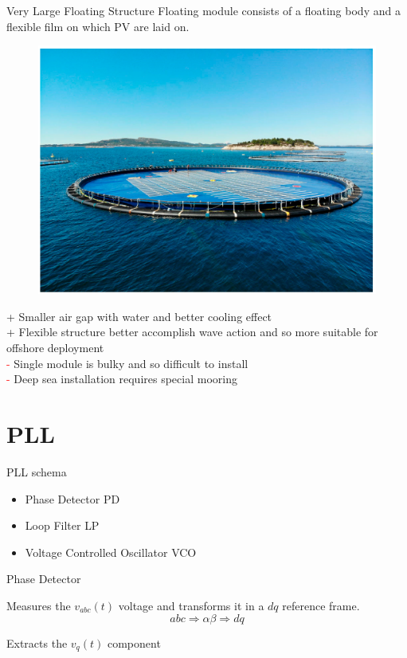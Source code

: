 \documentclass[aspectratio=169, 12pt]{beamer}
\begin{document}
\begin{frame}{Very Large Floating Structure}
  Floating module consists of a floating body and a flexible film on which PV are laid on.
  \begin{figure}
    \centering
    \includegraphics[width=0.3\columnwidth]{figure/vlfs.png}
  \end{figure}

  \textcolor{NTNUgreen}{+} Smaller air gap with water and better cooling effect\\
  \textcolor{NTNUgreen}{+} Flexible structure better accomplish wave action and so more suitable for offshore deployment\\
  \textcolor{red}{-} Single module is bulky and so difficult to install\\
  \textcolor{red}{-} Deep sea installation requires special mooring\\
  
\end{frame}

\section{PLL}  
\begin{frame}{PLL schema}{\insertsection}
  \begin{figure}
     
  \end{figure}
\begin{itemize}
  \item Phase Detector \textcolor{NTNUBlue}{PD}
  \item Loop Filter \textcolor{NTNUBlue}{LP}
  \item Voltage Controlled Oscillator \textcolor{NTNUBlue}{VCO}
\end{itemize}
\end{frame}

\begin{frame}{Phase Detector}{\insertsection}
  \begin{figure}
     
  \end{figure}
  Measures the $v_{abc}(t)$ voltage and \textcolor{NTNUBlue}{transforms} it in a $dq$ reference frame.
  \begin{equation*}
    abc \Rightarrow \alpha\beta \Rightarrow dq
  \end{equation*}

  Extracts the $v_q(t)$ component
\end{frame}
\end{document}

